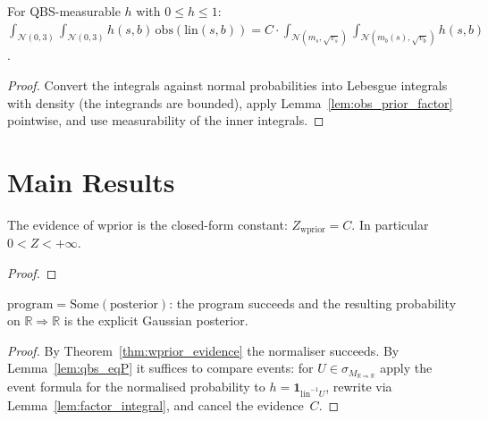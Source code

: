\begin{lemma}\label{lem:factor_integral}
  \rocqok
  For QBS-measurable $h$ with $0 \le h \le 1$:
  $\int_{\mathcal{N}(0,3)}\int_{\mathcal{N}(0,3)} h(s,b)\,
  \mathrm{obs}(\mathrm{lin}(s,b)) = C \cdot
  \int_{\mathcal{N}(m_s,\sqrt{v_s})}\int_{\mathcal{N}(m_b(s),\sqrt{v_b})}
  h(s,b)$.
\end{lemma}
\begin{proof}
  \rocqok
  Convert the integrals against normal probabilities into Lebesgue
  integrals with density (the integrands are bounded), apply
  Lemma~\ref{lem:obs_prior_factor} pointwise, and use measurability of the
  inner integrals.
\end{proof}


\section{Main Results}\label{sec:main_results}

\begin{theorem}\label{thm:wprior_evidence}
  \rocqok
  The evidence of $\mathrm{wprior}$ is the closed-form constant:
  $Z_{\mathrm{wprior}} = C$. In particular $0 < Z < +\infty$.
\end{theorem}
\begin{proof}\rocqok\end{proof}

\begin{theorem}\label{thm:program_posterior}
  \rocqok
  $\mathrm{program} = \mathrm{Some}(\mathrm{posterior})$: the program
  succeeds and the resulting probability on
  $\mathbb{R} \Rightarrow \mathbb{R}$ is the explicit Gaussian posterior.
\end{theorem}
\begin{proof}
  \rocqok
  By Theorem~\ref{thm:wprior_evidence} the normaliser succeeds. By
  Lemma~\ref{lem:qbs_eqP} it suffices to compare events: for
  $U \in \sigma_{M_{\mathbb{R} \Rightarrow \mathbb{R}}}$ apply the event
  formula for the normalised probability to $h = \mathbf{1}_{\mathrm{lin}^{-1}U}$,
  rewrite via Lemma~\ref{lem:factor_integral}, and cancel the evidence~$C$.
\end{proof}


